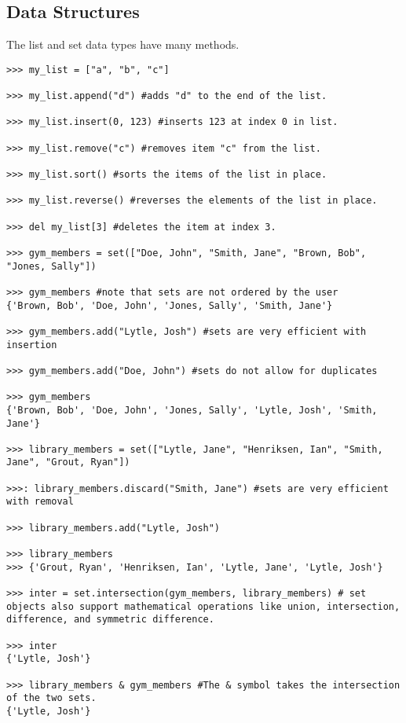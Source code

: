 \subsection*{Data Structures}
\begin{example}
The list and set data types have many methods. 
\begin{lstlisting}
>>> my_list = ["a", "b", "c"]

>>> my_list.append("d") #adds "d" to the end of the list.

>>> my_list.insert(0, 123) #inserts 123 at index 0 in list.

>>> my_list.remove("c") #removes item "c" from the list.

>>> my_list.sort() #sorts the items of the list in place.

>>> my_list.reverse() #reverses the elements of the list in place. 

>>> del my_list[3] #deletes the item at index 3.

>>> gym_members = set(["Doe, John", "Smith, Jane", "Brown, Bob", "Jones, Sally"])

>>> gym_members #note that sets are not ordered by the user
{'Brown, Bob', 'Doe, John', 'Jones, Sally', 'Smith, Jane'}

>>> gym_members.add("Lytle, Josh") #sets are very efficient with insertion

>>> gym_members.add("Doe, John") #sets do not allow for duplicates

>>> gym_members
{'Brown, Bob', 'Doe, John', 'Jones, Sally', 'Lytle, Josh', 'Smith, Jane'}

>>> library_members = set(["Lytle, Jane", "Henriksen, Ian", "Smith, Jane", "Grout, Ryan"])

>>>: library_members.discard("Smith, Jane") #sets are very efficient with removal

>>> library_members.add("Lytle, Josh") 

>>> library_members
>>> {'Grout, Ryan', 'Henriksen, Ian', 'Lytle, Jane', 'Lytle, Josh'}

>>> inter = set.intersection(gym_members, library_members) # set objects also support mathematical operations like union, intersection, difference, and symmetric difference.

>>> inter
{'Lytle, Josh'}

>>> library_members & gym_members #The & symbol takes the intersection of the two sets.
{'Lytle, Josh'}



\end{lstlisting}

\end{example}


